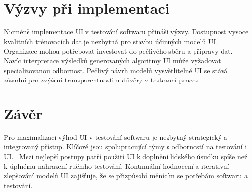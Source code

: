 \documentclass[a4paper, 11pt]{article}
\begin{document}
\section{Výzvy při implementaci}
Nicméně implementace UI v testování softwaru přináší výzvy. Dostupnost vysoce kvalitních trénovacích dat je nezbytná pro stavbu účinných modelů UI. Organizace mohou potřebovat investovat do pečlivého sběru a přípravy dat.~\cite{MonographNikolayMorozov2024} Navíc interpretace výsledků generovaných algoritmy UI může vyžadovat specializovanou odbornost. Pečlivý návrh modelů vysvětlitelné UI se stává zásadní pro zvýšení transparentnosti a důvěry v testovací proces.~\cite{ArticleVikasHassija2023}

\section{Závěr}
Pro maximalizaci výhod UI v testování softwaru je nezbytný strategický a integrovaný přístup. Klíčové jsou spolupracující týmy s odborností na testování i UI.~\cite{ElectronicDocumentKathyAlfadel} Mezi nejlepší postupy patří použití UI k doplnění lidského úsudku spíše než k úplnému nahrazení ručního testování. Kontinuální hodnocení a iterativní zlepšování modelů UI zajišťuje, že se přizpůsobí měnícím se potřebám softwaru a testování.~\cite{ThesesCharlesCollins2023}

\newpage



\end{document}
